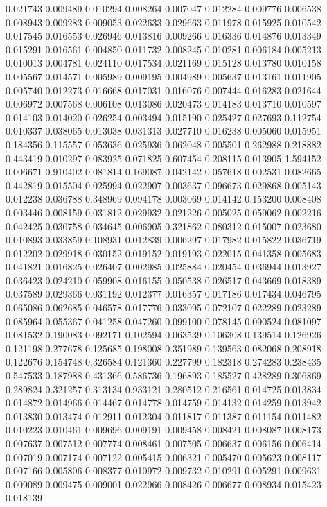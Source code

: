 0.021743
0.009489
0.010294
0.008264
0.007047
0.012284
0.009776
0.006538
0.008943
0.009283
0.009053
0.022633
0.029663
0.011978
0.015925
0.010542
0.017545
0.016553
0.026946
0.013816
0.009266
0.016336
0.014876
0.013349
0.015291
0.016561
0.004850
0.011732
0.008245
0.010281
0.006184
0.005213
0.010013
0.004781
0.024110
0.017534
0.021169
0.015128
0.013780
0.010158
0.005567
0.014571
0.005989
0.009195
0.004989
0.005637
0.013161
0.011905
0.005740
0.012273
0.016668
0.017031
0.016076
0.007444
0.016283
0.021644
0.006972
0.007568
0.006108
0.013086
0.020473
0.014183
0.013710
0.010597
0.014103
0.014020
0.026254
0.003494
0.015190
0.025427
0.027693
0.112754
0.010337
0.038065
0.013038
0.031313
0.027710
0.016238
0.005060
0.015951
0.184356
0.115557
0.053636
0.025936
0.062048
0.005501
0.262988
0.218882
0.443419
0.010297
0.083925
0.071825
0.607454
0.208115
0.013905
1.594152
0.006671
0.910402
0.081814
0.169087
0.042142
0.057618
0.002531
0.082665
0.442819
0.015504
0.025994
0.022907
0.003637
0.096673
0.029868
0.005143
0.012238
0.036788
0.348969
0.094178
0.003069
0.014142
0.153200
0.008408
0.003446
0.008159
0.031812
0.029932
0.021226
0.005025
0.059062
0.002216
0.042425
0.030758
0.034645
0.006905
0.321862
0.080312
0.015007
0.023680
0.010893
0.033859
0.108931
0.012839
0.006297
0.017982
0.015822
0.036719
0.012202
0.029918
0.030152
0.019152
0.019193
0.022015
0.041358
0.005683
0.041821
0.016825
0.026407
0.002985
0.025884
0.020454
0.036944
0.013927
0.036423
0.024210
0.059908
0.016155
0.050538
0.026517
0.043669
0.018389
0.037589
0.029366
0.031192
0.012377
0.016357
0.017186
0.017434
0.046795
0.065086
0.062685
0.046578
0.017776
0.033095
0.072107
0.022289
0.023289
0.085964
0.055367
0.041258
0.047260
0.099100
0.078145
0.090524
0.081097
0.081532
0.190083
0.092171
0.102594
0.063539
0.106308
0.139514
0.126926
0.121198
0.277678
0.125685
0.198008
0.351989
0.139563
0.082068
0.208918
0.122676
0.154748
0.326584
0.121360
0.227799
0.182318
0.274283
0.238435
0.547533
0.187988
0.431366
0.586736
0.196893
0.185527
0.428289
0.306869
0.289824
0.321257
0.313134
0.933121
0.280512
0.216561
0.014725
0.013834
0.014872
0.014966
0.014467
0.014778
0.014759
0.014132
0.014259
0.013942
0.013830
0.013474
0.012911
0.012304
0.011817
0.011387
0.011154
0.011482
0.010223
0.010461
0.009696
0.009191
0.009458
0.008421
0.008087
0.008173
0.007637
0.007512
0.007774
0.008461
0.007505
0.006637
0.006156
0.006414
0.007019
0.007174
0.007122
0.005415
0.006321
0.005470
0.005623
0.008117
0.007166
0.005806
0.008377
0.010972
0.009732
0.010291
0.005291
0.009631
0.009089
0.009475
0.009001
0.022966
0.008426
0.006677
0.008934
0.015423
0.018139
